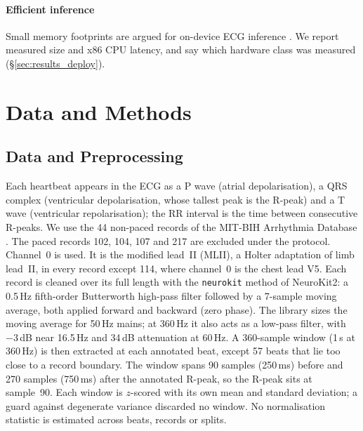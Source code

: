 \documentclass[preprint,12pt]{elsarticle}
\begin{document}
\paragraph{Efficient inference} Small memory footprints are argued for on-device ECG inference \cite{farag_tiny_2023, elsheikhy_lightweight_2025}. We report measured size and x86 CPU latency, and say which hardware class was measured (\S\ref{sec:results_deploy}).

\section{Data and Methods}
\label{sec:methods}

\subsection{Data and Preprocessing}
\label{sec:preprocessing}
Each heartbeat appears in the ECG as a P wave (atrial depolarisation), a QRS complex (ventricular depolarisation, whose tallest peak is the R-peak) and a T wave (ventricular repolarisation); the RR interval is the time between consecutive R-peaks. We use the 44 non-paced records of the MIT-BIH Arrhythmia Database \cite{moody_impact_2001, goldberger_physiobank_2000, pollard_physionet_2026}. The paced records 102, 104, 107 and 217 are excluded under the protocol. Channel~0 is used. It is the modified lead~II (MLII), a Holter adaptation of limb lead~II, in every record except 114, where channel~0 is the chest lead V5. Each record is cleaned over its full length with the \texttt{neurokit} method of NeuroKit2: a 0.5\,Hz fifth-order Butterworth high-pass filter followed by a 7-sample moving average, both applied forward and backward (zero phase). The library sizes the moving average for 50\,Hz mains; at 360\,Hz it also acts as a low-pass filter, with $-3$\,dB near 16.5\,Hz and 34\,dB attenuation at 60\,Hz. A 360-sample window (1\,s at 360\,Hz) is then extracted at each annotated beat, except 57 beats that lie too close to a record boundary. The window spans 90 samples (250\,ms) before and 270 samples (750\,ms) after the annotated R-peak, so the R-peak sits at sample~90. Each window is $z$-scored with its own mean and standard deviation; a guard against degenerate variance discarded no window. No normalisation statistic is estimated across beats, records or splits.
\end{document}
